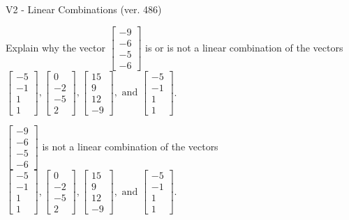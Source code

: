 \begin{exercise}
  \begin{exerciseTitle}V2 - Linear Combinations (ver. 486)\end{exerciseTitle}
  \begin{exerciseStatement}
    Explain why the vector \(\left[\begin{array}{c}
-9 \\
-6 \\
-5 \\
-6
\end{array}\right]\)  is or is not a linear 
	combination of the vectors \(\left[\begin{array}{c}
-5 \\
-1 \\
1 \\
1
\end{array}\right] , \left[\begin{array}{c}
0 \\
-2 \\
-5 \\
2
\end{array}\right] , \left[\begin{array}{c}
15 \\
9 \\
12 \\
-9
\end{array}\right] , \text{ and } \left[\begin{array}{c}
-5 \\
-1 \\
1 \\
1
\end{array}\right]\).
	


  \end{exerciseStatement}
  \begin{exerciseAnswer}
   \(\left[\begin{array}{c}
-9 \\
-6 \\
-5 \\
-6
\end{array}\right]\) 
  	 is not  
	a linear combination of the vectors \(\left[\begin{array}{c}
-5 \\
-1 \\
1 \\
1
\end{array}\right] , \left[\begin{array}{c}
0 \\
-2 \\
-5 \\
2
\end{array}\right] , \left[\begin{array}{c}
15 \\
9 \\
12 \\
-9
\end{array}\right] , \text{ and } \left[\begin{array}{c}
-5 \\
-1 \\
1 \\
1
\end{array}\right]\).


\end{exerciseAnswer}
\end{exercise}
